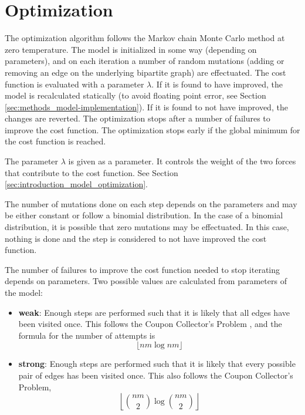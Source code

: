 \section{Optimization}
\label{sec:methods_optimization}

The optimization algorithm follows the Markov chain Monte Carlo method at zero temperature.
The model is initialized in some way (depending on parameters), and on each iteration a number of random mutations (adding or removing an edge on the underlying bipartite graph) are effectuated.
The cost function is evaluated with a parameter $\lambda$.
If it is found to have improved, the model is recalculated statically (to avoid floating point error, see Section \ref{sec:methods_model-implementation}).
If it is found to not have improved, the changes are reverted.
The optimization stops after a number of failures to improve the cost function.
The optimization stops early if the global minimum for the cost function is reached.

The parameter $\lambda$ is given as a parameter.
It controls the weight of the two forces that contribute to the cost function.
See Section \ref{sec:introduction_model_optimization}.

The number of mutations done on each step depends on the parameters and may be either constant or follow a binomial distribution.
In the case of a binomial distribution, it is possible that zero mutations may be effectuated.
In this case, nothing is done and the step is considered to not have improved the cost function.

The number of failures to improve the cost function needed to stop iterating depends on parameters.
Two possible values are calculated from parameters of the model:
\begin{itemize}
\item \textbf{weak}:
  Enough steps are performed such that it is likely that all edges have been visited once.
  This follows the Coupon Collector's Problem \cite{Mitzenmacher2017}, and the formula for the number of attempts is
  \begin{equation*}
    \lfloor nm \log nm \rfloor
  \end{equation*}
\item \textbf{strong}:
  Enough steps are performed such that it is likely that every possible pair of edges has been visited once.
  This also follows the Coupon Collector's Problem,
  \begin{equation*}
    \left\lfloor {nm \choose 2} \log {nm \choose 2} \right\rfloor
  \end{equation*}
\end{itemize}

